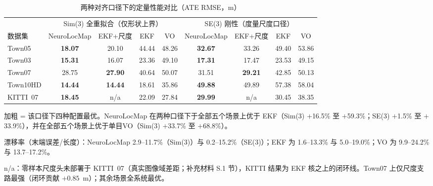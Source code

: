 \begin{table}[!t]
    \centering
    \setlength{\tabcolsep}{3pt}
    \footnotesize
    \caption{两种对齐口径下的定量性能对比（ATE RMSE，m）}
    \label{tab:results}
    \begin{threeparttable}
        \scriptsize\begin{tabular}{@{}l cccc cccc@{}}
            \toprule
            & \multicolumn{4}{c}{Sim(3) 全重拟合（仅形状上界）} & \multicolumn{4}{c}{SE(3) 刚性（度量尺度口径）} \\
            \cmidrule(lr){2-5} \cmidrule(lr){6-9}
            数据集 & NeuroLocMap & EKF+尺度 & EKF & VO & NeuroLocMap & EKF+尺度 & EKF & VO \\
            \midrule
            Town05   & \textbf{18.07} & 20.10 & 44.44 & 48.26 & \textbf{32.67} & 33.26 & 49.40 & 53.86 \\
            Town03   & \textbf{15.31} & 16.07 & 23.36 & 49.10 & \textbf{17.31} & 17.47 & 23.53 & 49.15 \\
            Town07   & 28.75 & \textbf{27.90} & 40.64 & 50.07 & 31.51 & \textbf{29.21} & 42.85 & 50.13 \\
            Town10HD & \textbf{14.44} & \textbf{14.44} & 18.61 & 35.86 & \textbf{49.88} & 49.89 & 57.38 & 58.04 \\
            KITTI~07 & \textbf{18.45} & n/a              & 22.09 & 27.84 & \textbf{29.99} & n/a              & 30.45 & 38.35 \\
            \bottomrule
        \end{tabular}
        \begin{tablenotes}
            \scriptsize
            \item 加粗 = 该口径下四种配置最优。NeuroLocMap 在两种口径下于全部五个场景上优于 EKF（Sim(3) $+$16.5\% 至 $+$59.3\%；SE(3) $+$1.5\% 至 $+$33.9\%），并在全部五个场景上优于单目VO（Sim(3) $+$33.7\% 至 $+$68.8\%）。
            \item 漂移率（末端误差/长度）：NeuroLocMap 2.9--11.7\%（Sim(3)）与 0.2--15.2\%（SE(3)）；EKF 为 1.6--13.3\% 与 5.0--19.0\%；VO 为 9.9--24.2\% 与 13.7--17.2\%。
            \item n/a：零样本尺度头未部署于 KITTI~07（真实图像域差距；补充材料 S.1 节），KITTI 结果为 EKF 核之上的闭环线。Town07 上仅尺度支路最强（闭环贡献 $+0.85$~m）；其余场景全系统最优。
        \end{tablenotes}
    \end{threeparttable}
\end{table}

